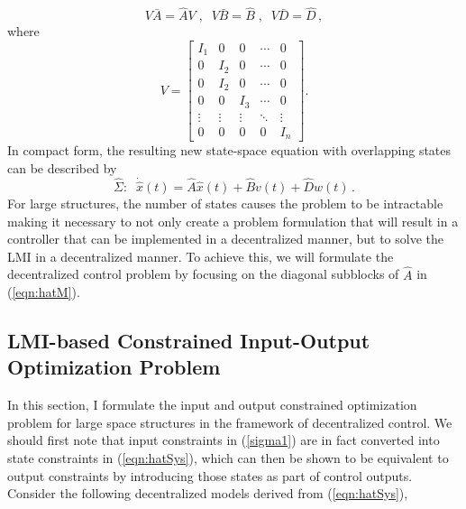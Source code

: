 \documentclass[11pt]{ucthesis}
\begin{document}
\begin{equation}
V \bar{A} = \hat{A}V \;,\;\; V \bar{B} = \hat{B}\;,\;\;V \bar{D} = \hat{D}\,,
\end{equation}
where
\begin{equation}
V = \begin{bmatrix}
I_{1}&0&0&\cdots&0\\
0&I_2&0&\cdots&0\\
0&I_2&0&\cdots&0\\
0&0&I_3&\cdots&0\\
\vdots&\vdots&\vdots&\ddots&\vdots\\
0&0&0&0&I_n
\end{bmatrix} .
\end{equation}
In compact form, the resulting new state-space equation with overlapping states can be described by
\begin{equation}
\hat{\Sigma} : \;\; \dot{\hat{x}}(t) = \hat{A}\hat{x}(t) + \hat{B}v(t) + \hat{D}w(t) \,.
\label{eqn:hatSys}
\end{equation}
For large structures, the number of states causes the problem to be intractable making it necessary to not only create a problem formulation that will result in a controller that can be implemented in a decentralized manner, but to solve the LMI in a decentralized manner. To achieve this, we will formulate the decentralized control problem by focusing on the diagonal subblocks of $\hat{A}$ in (\ref{eqn:hatM}).  

\subsection{LMI-based Constrained Input-Output Optimization Problem}
\label{sec:LMI}
In this section, I formulate the input and output constrained optimization problem for large space structures in the framework of decentralized control. We should first note that input constraints in (\ref{sigma1}) are in fact converted into state constraints in (\ref{eqn:hatSys}), which can then be shown to be equivalent to output constraints by introducing those states as part of control outputs. Consider the following decentralized models derived from (\ref{eqn:hatSys}),
\end{document}
